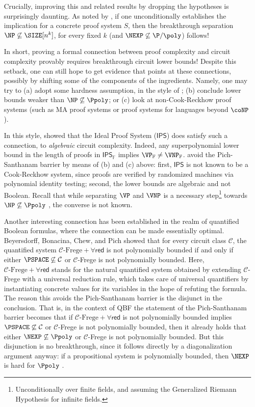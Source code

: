 \documentclass[11pt]{article}
\newcommand{\IPS}{\mathsf{IPS}}
\theoremstyle{definition}
\theoremstyle{plain}
\theoremstyle{remark}
\newcommand{\calC}{\mathcal{C}}
\begin{document}
Crucially, improving this and related results by dropping the hypotheses is surprisingly daunting. As noted by \citeauthor{Pseopt} \cite[Prop. 1]{Pseopt}, if one unconditionally establishes the implication  for a concrete proof system $S$, then the breakthrough separation $\NP \not\subseteq \SIZE[n^k]$, for every fixed $k$ (and $\NEXP\not\subseteq\P/\poly$) follows!

In short, proving a formal connection between proof complexity and circuit complexity provably requires breakthrough circuit lower bounds! Despite this setback, one can still hope to get evidence that points at these connections, possibly by shifting some of the components of the ingredients. Namely, one may try to (a) adopt some hardness assumption, in the style of \cite{Pseopt}; (b) conclude lower bounds weaker than $\NP \not\subseteq \Ppoly$; or (c) look at non-Cook-Reckhow proof systems (such as MA proof systems or proof systems for languages beyond $\coNP$).

In this style, \citeauthor{GP18} \cite{GP18} showed that the Ideal Proof System ($\IPS$) does satisfy such a connection, to \emph{algebraic} circuit complexity. Indeed, any superpolynomial lower bound in the length of proofs in $\IPS_{\mathbb{F}}$ implies $\VP_{\mathbb{F}} \neq \VNP_{\mathbb{F}}$. \citeauthor{GP18} avoid the Pich-Santhanam barrier by means of (b) and (c) above: first, $\IPS$ is not known to be a Cook-Reckhow system, since proofs are verified by randomized machines via polynomial identity testing; second, the lower bounds are algebraic and not Boolean. Recall that while separating $\VP$ and $\VNP$ is a necessary step\footnote{Unconditionally over finite fields, and assuming the Generalized Riemann Hypothesis for infinite fields.} towards $\NP \not\subseteq \Ppoly$ \cite{Bur00}, the converse is not known.

Another interesting connection has been established in the realm of quantified Boolean formulas, where the connection can be made essentially optimal. Beyersdorff, Bonacina, Chew, and Pich \cite{BBCP20-QBF} showed that for every circuit class $\calC$, the quantified system $\calC\text{-Frege} + \forall\mathsf{red}$ is not polynomially bounded if and only if either $\PSPACE\not\subseteq \calC$ or $\calC$-Frege is not polynomially bounded. Here, $\calC\text{-Frege} + \forall\mathsf{red}$ stands for the natural quantified system obtained by extending $\calC$-Frege with a universal reduction rule, which takes care of universal quantifiers by instantiating concrete values for its variables in the hope of refuting the formula. The reason this avoids the Pich-Santhanam barrier is the disjunct in the conclusion. That is, in the context of QBF the statement of the Pich-Santhanam barrier becomes that if $\calC\text{-Frege} + \forall\mathsf{red}$ is not polynomially bounded implies $\PSPACE\not\subseteq \calC$ or $\calC$-Frege is not polynomially bounded, then it already holds that either $\NEXP\not\subseteq\Ppoly$ or $\calC$-Frege is not polynomially bounded. But this disjunction is no breakthrough, since it follows directly by a diagonalization argument anyway: if a propositional system is polynomially bounded, then $\NEXP$ is hard for $\Ppoly$ \cite{Kra04-Diag}.
\end{document}
